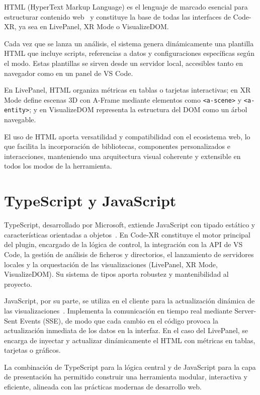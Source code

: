 \documentclass[a4paper, 12pt]{book}
\begin{document}
HTML (HyperText Markup Language) es el lenguaje de marcado esencial para estructurar contenido web~\cite{html} y constituye la base de todas las interfaces de Code-XR, ya sea en LivePanel, XR Mode o VisualizeDOM.  

Cada vez que se lanza un análisis, el sistema genera dinámicamente una plantilla HTML que incluye scripts, referencias a datos y configuraciones específicas según el modo. Estas plantillas se sirven desde un servidor local, accesibles tanto en navegador como en un panel de VS Code.  

En LivePanel, HTML organiza métricas en tablas o tarjetas interactivas; en XR Mode define escenas 3D con A-Frame mediante elementos como \texttt{<a-scene>} y \texttt{<a-entity>}; y en VisualizeDOM representa la estructura del DOM como un árbol navegable.  

El uso de HTML aporta versatilidad y compatibilidad con el ecosistema web, lo que facilita la incorporación de bibliotecas, componentes personalizados e interacciones, manteniendo una arquitectura visual coherente y extensible en todos los modos de la herramienta.

\section{TypeScript y JavaScript}
\label{sec:typescript-javascript}

TypeScript, desarrollado por Microsoft, extiende JavaScript con tipado estático y características orientadas a objetos~\cite{typescript}. En Code-XR constituye el motor principal del plugin, encargado de la lógica de control, la integración con la API de VS Code, la gestión de análisis de ficheros y directorios, el lanzamiento de servidores locales y la orquestación de las visualizaciones (LivePanel, XR Mode, VisualizeDOM). Su sistema de tipos aporta robustez y mantenibilidad al proyecto.

JavaScript, por su parte, se utiliza en el cliente para la actualización dinámica de las visualizaciones~\cite{javascript}. Implementa la comunicación en tiempo real mediante Server-Sent Events (SSE), de modo que cada cambio en el código provoca la actualización inmediata de los datos en la interfaz. En el caso del LivePanel, se encarga de inyectar y actualizar dinámicamente el HTML con métricas en tablas, tarjetas o gráficos.

La combinación de TypeScript para la lógica central y de JavaScript para la capa de presentación ha permitido construir una herramienta modular, interactiva y eficiente, alineada con las prácticas modernas de desarrollo web.
\end{document}
